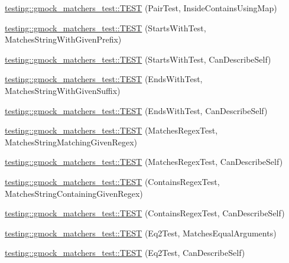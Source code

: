 \begin{DoxyCompactItemize}
\item 
\hyperlink{namespacetesting_1_1gmock__matchers__test_a9785412a9e786b1f81387204df577c73}{testing\+::gmock\+\_\+matchers\+\_\+test\+::\+T\+E\+ST} (Pair\+Test, Inside\+Contains\+Using\+Map)
\item 
\hyperlink{namespacetesting_1_1gmock__matchers__test_ac8a66c592ff57cce28b6f1d5211fd370}{testing\+::gmock\+\_\+matchers\+\_\+test\+::\+T\+E\+ST} (Starts\+With\+Test, Matches\+String\+With\+Given\+Prefix)
\item 
\hyperlink{namespacetesting_1_1gmock__matchers__test_a492143bbe0627c563c5d0c65bf3f4d5b}{testing\+::gmock\+\_\+matchers\+\_\+test\+::\+T\+E\+ST} (Starts\+With\+Test, Can\+Describe\+Self)
\item 
\hyperlink{namespacetesting_1_1gmock__matchers__test_ac3d41540d2ae7956d33c9eae1be67d91}{testing\+::gmock\+\_\+matchers\+\_\+test\+::\+T\+E\+ST} (Ends\+With\+Test, Matches\+String\+With\+Given\+Suffix)
\item 
\hyperlink{namespacetesting_1_1gmock__matchers__test_a80da065ed9f5fb87add88ae2bc14056d}{testing\+::gmock\+\_\+matchers\+\_\+test\+::\+T\+E\+ST} (Ends\+With\+Test, Can\+Describe\+Self)
\item 
\hyperlink{namespacetesting_1_1gmock__matchers__test_a5983e981b59498c6427ddb183c414bb7}{testing\+::gmock\+\_\+matchers\+\_\+test\+::\+T\+E\+ST} (Matches\+Regex\+Test, Matches\+String\+Matching\+Given\+Regex)
\item 
\hyperlink{namespacetesting_1_1gmock__matchers__test_acb4e75ec699fe1bc178e7ec32fb479c8}{testing\+::gmock\+\_\+matchers\+\_\+test\+::\+T\+E\+ST} (Matches\+Regex\+Test, Can\+Describe\+Self)
\item 
\hyperlink{namespacetesting_1_1gmock__matchers__test_a0a23f3ff8f97ccf74cd64673edc6694f}{testing\+::gmock\+\_\+matchers\+\_\+test\+::\+T\+E\+ST} (Contains\+Regex\+Test, Matches\+String\+Containing\+Given\+Regex)
\item 
\hyperlink{namespacetesting_1_1gmock__matchers__test_ac3d469a146dec0c6ede2b46ff992c8d7}{testing\+::gmock\+\_\+matchers\+\_\+test\+::\+T\+E\+ST} (Contains\+Regex\+Test, Can\+Describe\+Self)
\item 
\hyperlink{namespacetesting_1_1gmock__matchers__test_a768adf8450910e4c3ac0cb2caec8a4c2}{testing\+::gmock\+\_\+matchers\+\_\+test\+::\+T\+E\+ST} (Eq2\+Test, Matches\+Equal\+Arguments)
\item 
\hyperlink{namespacetesting_1_1gmock__matchers__test_a45da3962b4ae052dd47e1ae1bfd8b762}{testing\+::gmock\+\_\+matchers\+\_\+test\+::\+T\+E\+ST} (Eq2\+Test, Can\+Describe\+Self)

\end{DoxyCompactItemize}
